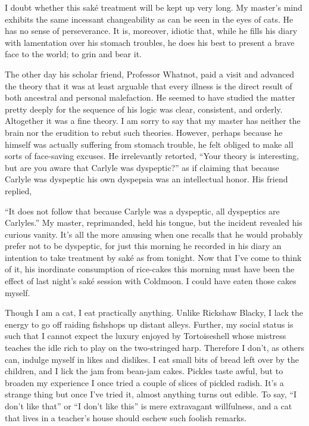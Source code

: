 \documentclass{book}
\begin{document}
I doubt whether this saké treatment will be kept up very long. My
master's mind exhibits the same incessant changeability as can be seen
in the eyes of cats. He has no sense of perseverance. It is, moreover,
idiotic that, while he fills his diary with lamentation over his stomach
troubles, he does his best to present a brave face to the world; to grin
and bear it.

The other day his scholar friend, Professor Whatnot, paid a visit and
advanced the theory that it was at least arguable that every illness is
the direct result of both ancestral and personal malefaction. He seemed
to have studied the matter pretty deeply for the sequence of his logic
was clear, consistent, and orderly. Altogether it was a fine theory. I
am sorry to say that my master has neither the brain nor the erudition
to rebut such theories. However, perhaps because he himself was actually
suffering from stomach trouble, he felt obliged to make all sorts of
face-saving excuses. He irrelevantly retorted, ``Your theory is
interesting, but are you aware that Carlyle was dyspeptic?'' as if
claiming that because Carlyle was dyspeptic his own dyspepsia was an
intellectual honor. His friend replied,

``It does not follow that because Carlyle was a dyspeptic, all
dyspeptics are Carlyles.'' My master, reprimanded, held his tongue, but
the incident revealed his curious vanity. It's all the more amusing when
one recalls that he would probably prefer not to be dyspeptic, for just
this morning he recorded in his diary an intention to take treatment by
saké as from tonight. Now that I've come to think of it, his inordinate
consumption of rice-cakes this morning must have been the effect of last
night's saké session with Coldmoon. I could have eaten those cakes
myself.

Though I am a cat, I eat practically anything. Unlike Rickshaw Blacky, I
lack the energy to go off raiding fishshops up distant alleys. Further,
my social status is such that I cannot expect the luxury enjoyed by
Tortoiseshell whose mistress teaches the idle rich to play on the
two-stringed harp. Therefore I don't, as others can, indulge myself in
likes and dislikes. I eat small bits of bread left over by the children,
and I lick the jam from bean-jam cakes. Pickles taste awful, but to
broaden my experience I once tried a couple of slices of pickled radish.
It's a strange thing but once I've tried it, almost anything turns out
edible. To say, ``I don't like that'' or ``I don't like this'' is mere
extravagant willfulness, and a cat that lives in a teacher's house
should eschew such foolish remarks.
\end{document}
